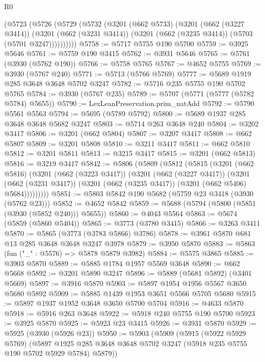 \begin{lexlean}{R0}
\begin{coremodule}
    (@5723
      (@5726
        (@5729
          (@5732
            (@3201
              (@662 @5733)
              (@3201
                (@662 (@3227 @3414))
                (@3201
                  (@662 (@3231 @3414))
                  (@3201 (@662 (@3235 @3414)) (@5703 (@5701 @3247))))))))))
@5758 := @5717 @5755 @190 @5700
@5759 := @3925 @5646
@5761 := @5759 @190 @3415
@5762 := @3931 @5646
@5765 := @5761 (@3930 (@5762 @190))
@5766 := @5758 @5765
@5767 := @4652 @5755
@5769 := @3930 (@5767 @240)
@5771 := @5713 (@5766 @5769)
@5777 := @5689 @1919 @285 @3648 @3648 @5702 @3247
@5782 := @5716 @235 @5755 @190 @5702 @5765
@5784 := @3930 (@5767 @235)
@5789 := @5707 (@5771 (@5777 (@5782 @5784) @5655))
@5790 := LexLeanPreservation.prim_natAdd
@5792 := @5790 @5561 @5563
@5794 := @5695 (@5789 @5792)
@5800 := @5689 @1937 @285 @3648 @3648 @5682 @3247
@5803 := @5714 @263 @3648 @240
@5804 := @3202 @3417
@5806 := @3201 (@662 @5804)
@5807 := @3207 @3417
@5808 := @662 @5807
@5809 := @3201 @5808
@5810 := @3211 @3417
@5811 := @662 @5810
@5812 := @3201 @5811
@5813 := @3215 @3417
@5815 := @3201 (@662 @5813)
@5816 := @3219 @3417
@5842 := @5806
    (@5809
      (@5812
        (@5815
          (@3201
            (@662 @5816)
            (@3201
              (@662 (@3223 @3417))
              (@3201
                (@662 (@3227 @3417))
                (@3201
                  (@662 (@3231 @3417))
                  (@3201 (@662 (@3235 @3417)) (@3201 (@662 @5406) @5684)))))))))
@5851 := @5803 @5842 @190 @5682 (@5759 @23 @3418 (@3930 (@5762 @23)))
@5852 := @4652 @5842
@5859 := @5688 (@5794 (@5800 (@5851 (@3930 (@5852 @240))) @5655))
@5860 := @4043 @5564
@5863 := @5674 (@5859 (@5860 @5404))
@5865 := @3773 (@3780 @3415)
@5866 := @3263 @3411
@5870 := @5865 (@3773 (@3783 @5866) @3786)
@5878 := @3961 @5870 @681 @13 @285 @3648 @3648 @3247 @3978
@5879 := @3950 @5870
@5883 := @5863 (fun ("_" : @5576) => @5878 @5879 @3982)
@5884 := @5575 @3865
@5885 := @3903 @5870
@5889 := @5885 @1784 @1957 @5569 @3648
@5890 := @662 @5668
@5892 := @3201 @5890 @3247
@5896 := @5889 (@5681 @5892) (@3401 @5669)
@5897 := @3916 @5870
@5903 := @5897 @1954 @1956 @5567 @3650 @5680 @5892
@5909 := @5885 @1439 @1953 @3651 @5566 @5705 @5680
@5915 := @5897 @1937 @1952 @3648 @3650 @5700 @5704
@5916 := @4633 @5870
@5918 := @5916 @263 @3648
@5922 := @5918 @240 @5755 @190 @5700
@5923 := @3925 @5870
@5925 := @5923 @23 @3415
@5926 := @3931 @5870
@5929 := @5925 (@3930 (@5926 @23))
@5950 := @5903
    (@5909
      (@5915
        (@5922 @5929 @5769)
        (@5897 @1925 @285 @3648 @3648 @5702 @3247 (@5918 @235 @5755 @190 @5702 @5929 @5784) @5879))

\end{coremodule}
\end{lexlean}
